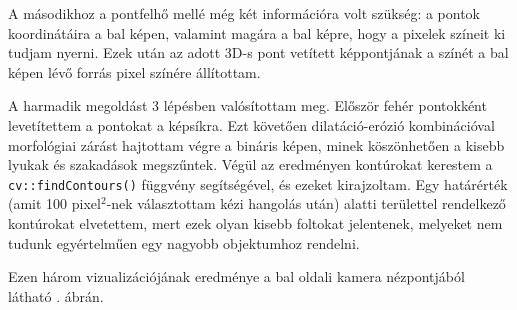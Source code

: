 A másodikhoz a pontfelhő mellé még két információra volt szükség: a pontok koordinátáira a bal képen, valamint magára a bal képre, hogy a pixelek színeit ki tudjam nyerni. Ezek után az adott 3D-s pont vetített képpontjának a színét a bal képen lévő forrás pixel színére állítottam.

A harmadik megoldást 3 lépésben valósítottam meg. Először fehér pontokként levetítettem a pontokat a képsíkra. Ezt követően dilatáció-erózió kombinációval morfológiai zárást hajtottam végre a bináris képen, minek köszönhetően a kisebb lyukak és szakadások megszűntek. Végül az eredményen kontúrokat kerestem a \texttt{cv::findContours()} függvény segítségével, és ezeket kirajzoltam. Egy határérték (amit 100 pixel$^2$-nek választottam kézi hangolás után) alatti területtel rendelkező kontúrokat elvetettem, mert ezek olyan kisebb foltokat jelentenek, melyeket nem tudunk egyértelműen egy nagyobb objektumhoz rendelni.

Ezen három vizualizációjának eredménye a bal oldali kamera nézpontjából látható . ábrán.

